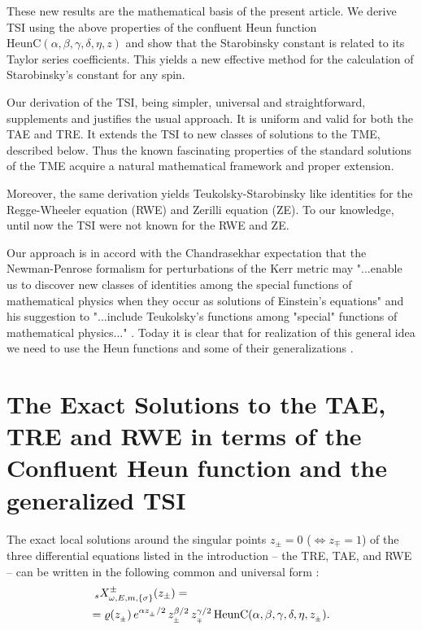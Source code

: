 \documentclass[prd,aps,twocolumn,leterpaper,preprintnumbers]{revtex4}
\numberwithin{equation}{section}
\newcommand{\ben}{\begin{eqnarray}}
\newcommand{\een}{\end{eqnarray}}
\newcommand{\la}{\label}
\begin{document}
These new results are the mathematical basis of the present article.
We derive TSI using the above properties of the confluent Heun function
$\text{HeunC}(\alpha,\beta,\gamma,\delta,\eta,z)$ and show that
the Starobinsky constant is related to its Taylor series coefficients.
This yields a new effective method for the calculation of Starobinsky's
constant for any spin.

Our derivation of the TSI, being simpler, universal and straightforward,
supplements and justifies the usual approach.
It is uniform and valid for both the TAE and TRE.
It extends the TSI to new classes of solutions to the TME, described below.
Thus the known fascinating properties of the standard solutions of the TME
acquire a natural mathematical framework and proper extension.

Moreover, the same derivation yields Teukolsky-Starobinsky like identities
for the Regge-Wheeler equation (RWE) and Zerilli equation (ZE).
To our knowledge, until now the TSI were not known for the RWE and ZE.

Our approach is in accord with the Chandrasekhar
expectation that the Newman-Penrose formalism for perturbations of the Kerr metric
may "...enable us to discover
new classes of identities among the special functions
of mathematical physics when they occur as solutions of Einstein's equations"
and his suggestion to
"...include Teukolsky's functions among "special"
functions of mathematical physics..." \cite{Chandra}.
Today it is clear that for realization of this general idea
we need to use the Heun functions and some of their generalizations \cite{Batic}.



\section{The Exact Solutions to the TAE, TRE and RWE in terms of the Confluent Heun function and the generalized TSI}

The exact local solutions around the singular points $z_\pm=0$ ($\Leftrightarrow z_\mp=1$)
of the three differential equations
listed in the introduction -- the TRE, TAE, and RWE --
can be written in the following common and universal form \cite{Fiziev1}:
\ben
\la{X}
{}_sX^\pm_{\omega,E,m,\{\sigma\}}(z_\pm) =\hskip 4.4truecm\\
=\varrho( z_{{}_\pm})\,e^{{{\alpha z_{{}_\pm}}/ 2}}\, z_{{}_\pm}^{{{\beta}/ 2}}\,
z_{{}_\mp}^{{{\gamma}/ 2}}\,
\text{HeunC}(\alpha,\beta,\gamma,\delta,\eta, z_{{}_\pm}).
\nonumber
\een
\end{document}
